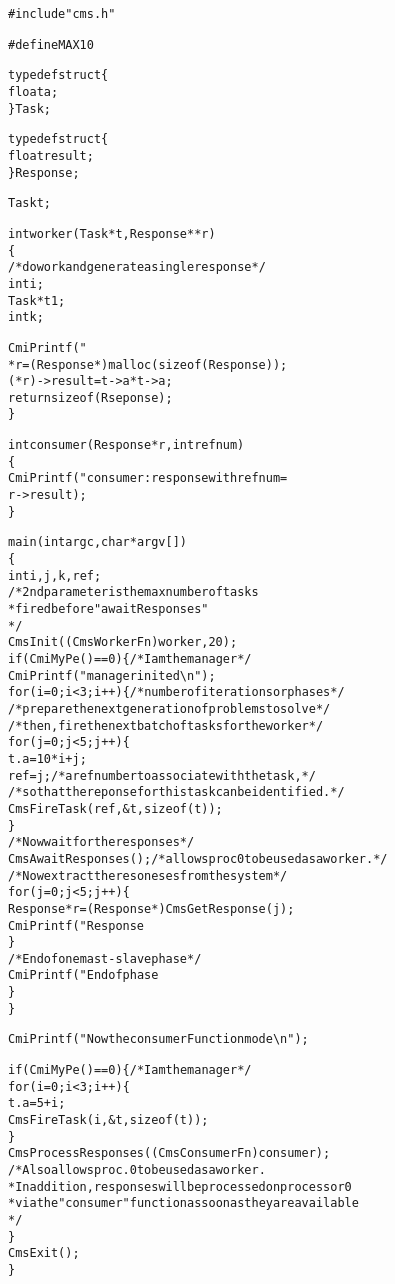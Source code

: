 \begin{alltt}
#include "cms.h"

#define MAX 10

typedef struct \{
    float a;
\} Task;

typedef struct \{
    float result;
\} Response;

Task t;

int worker(Task *t, Response **r)
\{
    /* do work and generate a single response */
    int i;
    Task *t1;
    int k;

    CmiPrintf("%d: in worker %f \verb+\n+", CmiMyPe(), t->a);
    *r = (Response *) malloc(sizeof(Response));
    (*r)->result = t->a * t->a;
    return sizeof(Rseponse);
\}

int consumer(Response * r, int refnum)
\{
    CmiPrintf("consumer: response with refnum = %d is %f\verb+\n+", refnum,
              r->result);
\}

main(int argc, char *argv[])
\{
    int i, j, k, ref;
    /* 2nd parameter is the max number of tasks 
     * fired before "awaitResponses"
     */
    CmsInit((CmsWorkerFn)worker, 20);
    if (CmiMyPe() == 0) \{ /* I am the manager */
        CmiPrintf("manager inited\verb+\n+");
        for (i = 0; i < 3; i++) \{ /* number of iterations or phases */
          /* prepare the next generation of problems to solve */
          /* then, fire the next batch of tasks for the worker */
            for (j = 0; j < 5; j++) \{
                t.a = 10 * i + j;
                ref = j;  /* a ref number to associate with the task, */
                /* so that the reponse for this task can be identified. */
                CmsFireTask(ref, \&t, sizeof(t));
            \}
          /* Now wait for the responses */
            CmsAwaitResponses();  /* allows proc 0 to be used as a worker. */
            /* Now extract the resoneses from the system */
            for (j = 0; j < 5; j++) \{
                Response *r = (Response *) CmsGetResponse(j);
                CmiPrintf("Response %d is: %f \verb+\n+", j, r->result);
            \}
          /* End of one mast-slave phase */
            CmiPrintf("End of phase %d\verb+\n+", i);
        \}
    \}

    CmiPrintf("Now the consumerFunction mode\verb+\n+");

    if (CmiMyPe() == 0) \{ /* I am the manager */
       for (i = 0; i < 3; i++) \{
           t.a = 5 + i;
           CmsFireTask(i, \&t, sizeof(t));
       \}
       CmsProcessResponses((CmsConsumerFn)consumer);
       /* Also allows proc. 0 to be used as a worker. 
        * In addition, responses will be processed on processor 0 
        * via the "consumer" function as soon as they are available 
        */
    \}
    CmsExit();
\}
\end{alltt}
